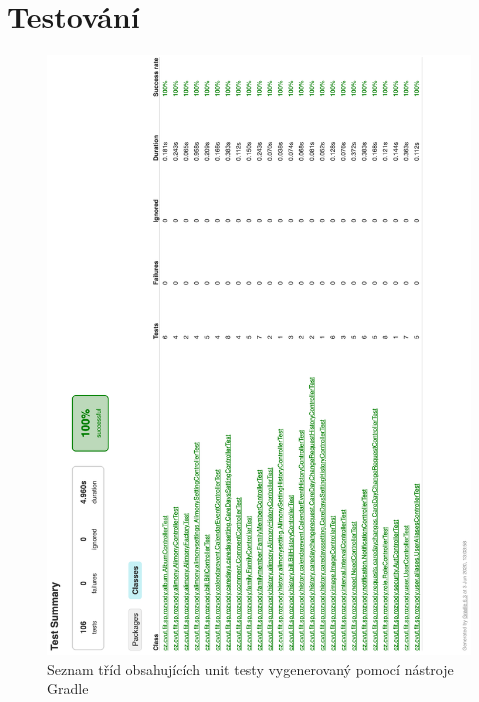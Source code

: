 \chapter{Testování}\label{dodatek:testing}
    \begin{figure}\centering
	    \includegraphics[width=1.0\textwidth]{pdfs/Gradle-unit-tests}
	    \caption[Seznam tříd obsahujících unit testy]{Seznam tříd obsahujících unit testy vygenerovaný pomocí nástroje Gradle}\label{image:gradle-unit-tests}
    \end{figure}

